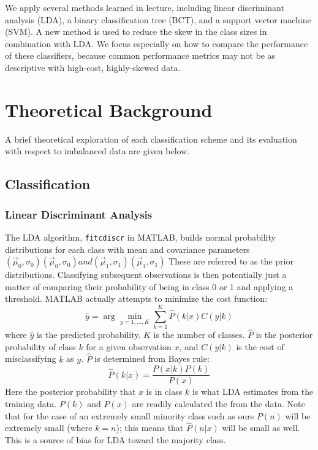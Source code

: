 \documentclass{article}
\begin{document}
We apply several methods learned in lecture, including linear discriminant analysis (LDA), a binary classification tree (BCT), and a support vector machine (SVM). A new method is used to reduce the skew in the class sizes in combination with LDA. We focus especially on how to compare the performance of these classifiers, because common performance metrics may not be as descriptive with high-cost, highly-skewed data.

\section{Theoretical Background}
A brief theoretical exploration of each classification scheme and its evaluation with respect to imbalanced data are given below.

\subsection{Classification}
\subsubsection{Linear Discriminant Analysis}
The LDA algorithm, \texttt{fitcdiscr} in MATLAB, builds normal probability distributions for each class with mean and covariance parameters $\left({\vec {\mu }}_{0}, \sigma_{0} \right) \left({\vec {\mu }}_{0}, \sigma_{0}\right) and \left({\vec {\mu }}_{1},\sigma_{1}\right) \left({\vec {\mu }}_{1}, \sigma_{1}\right)$
These are referred to as the prior distributions. Classifying subsequent observations is then potentially just a matter of comparing their probability of being in class 0 or 1 and applying a threshold.
MATLAB actually attempts to minimize the cost function:
\begin{equation}
\hat{y}=\arg\min_{y=1,...,K}\sum_{k=1}^{K}\hat{P}(k|x)C(y|k)
\end{equation}
where $\hat{y}$ is the predicted probability. $K$ is the number of classes. $\hat{P}$ is the posterior probability of class $k$ for a given observation $x$, and $C(y|k)$ is the cost of misclassifying $k$ as $y$.
$\hat{P}$ is determined from Bayes rule:
\begin{equation}
\hat{P}(k|x)=\frac{P(x|k)P(k)}{P(x)}
\end{equation}
Here the posterior probability that $x$ is in class $k$ is what LDA estimates from the training data.
$P(k)$ and $P(x)$ are readily calculated the from the data.
Note that for the case of an extremely small minority class such as ours $P(n)$ will be extremely small (where $k=n$); this means that $\hat{P}(n|x)$ will be small as well.
This is a source of bias for LDA toward the majority class.
\end{document}
